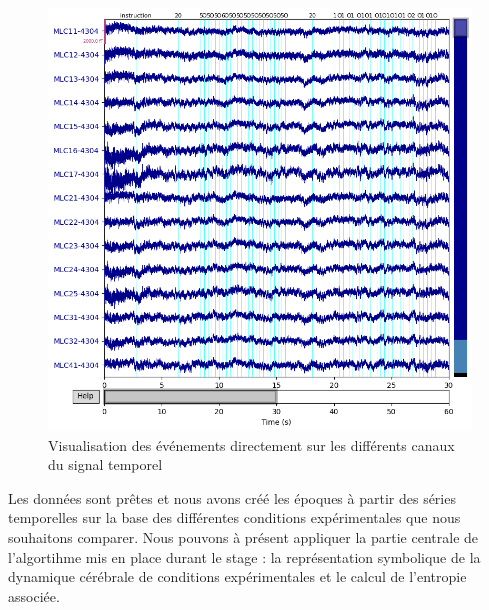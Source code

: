 \begin{figure}[!ht]
    \centering
    \includegraphics[width=13cm]{events_temporel.png}
    \caption{Visualisation des événements directement sur les différents canaux du signal temporel}
    \label{fig3.6}
\end{figure} 

\vspace{2ex}
Les données sont prêtes et nous avons créé les époques à partir des séries temporelles sur la base des différentes conditions expérimentales que nous souhaitons comparer. Nous pouvons à présent appliquer la partie centrale de l'algortihme mis en place durant le stage : la représentation symbolique de la dynamique cérébrale de conditions expérimentales et le calcul de l'entropie associée.
